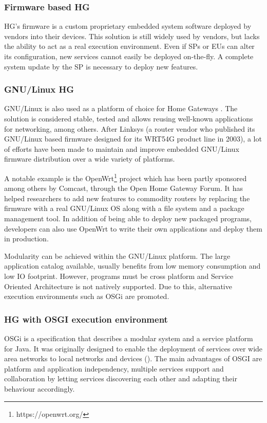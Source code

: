 \subsubsection{Firmware based HG}
HG's firmware is a custom proprietary embedded system software deployed by vendors into their devices.
This solution is still widely used by vendors, but lacks the ability to act as a real execution environment.
Even if SPs or EUs can alter its configuration, new services cannot easily be deployed on-the-fly.
A complete system update by the SP is necessary to deploy new features.
   
\subsubsection{GNU/Linux HG}
   
GNU/Linux is also used as a platform of choice for Home Gateways \cite{royon_multiservice_2007}.
The solution is considered stable, tested and allows reusing well-known applications for networking, among others.
After Linksys (a router vendor who published its GNU/Linux based firmware designed for its WRT54G product line in 2003), a lot of efforts have been made to maintain and improve embedded GNU/Linux firmware distribution over a wide variety of platforms.

A notable example is the OpenWrt\footnote{https://openwrt.org/} project which has been partly sponsored among others by Comcast, through the Open Home Gateway Forum.
It has helped researchers to add new features to commodity routers by replacing the firmware with a real GNU/Linux OS along with a file system and a package management tool.
In addition of being able to deploy new packaged programs, developers can also use OpenWrt to write their own applications and deploy them in production.


Modularity can be achieved within the GNU/Linux platform.
The large application catalog available, usually benefits from low memory consumption and low IO footprint.
However, programs must be cross platform and Service Oriented Architecture is not natively supported.
Due to this, alternative execution environments such as OSGi are promoted.
   
\subsubsection{HG with OSGI execution environment}
   
OSGi is a specification that describes a modular system and a service platform for Java.
It was originally designed to enable the deployment of services over wide area networks to local networks and devices (\cite{marples_open_2001}).
The main advantages of OSGI are platform and application independency, multiple services support and collaboration by letting services discovering each other and adapting their behaviour accordingly.

